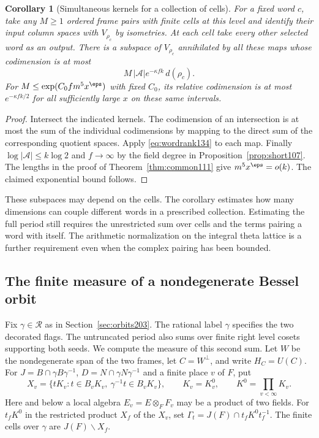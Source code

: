 \documentclass[a4paper,11pt]{article}
\newtheorem{corollary}[proposition]{Corollary}
\theoremstyle{definition}
\theoremstyle{remark}
\numberwithin{equation}{section}
\begin{document}
\begin{corollary}[Simultaneous kernels for a collection of cells]
\label{cor:many134}
For a fixed word \(c\), take any \(M\ge1\) ordered frame pairs
with finite cells at this level and identify their input column
spaces with \(V_{\rho_c}\) by isometries. At each cell take every
other selected word as an output. There is a subspace of
\(V_{\rho_c}\) annihilated by all these maps whose codimension
is at most
\[
             M\,|\mathcal A|e^{-\kappa fk}\,d(\rho_c).
\]
For \(M\le\exp(C_0 f m^5 x^\eps)\) with fixed \(C_0\), its
relative codimension is at most \(e^{-\kappa fk/2}\) for all
sufficiently large \(x\) on these same intervals.
\end{corollary}
\begin{proof}
Intersect the indicated kernels. The codimension of an
intersection is at most the sum of the individual codimensions
by mapping to the direct sum of the corresponding quotient
spaces. Apply \eqref{eq:wordrank134} to each map. Finally
\(\log|\mathcal A|\le k\log 2\) and \(f\to\infty\) by the field
degree in Proposition~\ref{prop:short107}. The lengths in the
proof of Theorem~\ref{thm:common111} give \(m^5x^\eps=o(k)\).
The claimed exponential bound follows.
\end{proof}

These subspaces may depend on the cells. The corollary estimates
how many dimensions can couple different words in a prescribed
collection. Estimating the full period still requires the
unrestricted sum over cells and the terms pairing a word with
itself. The arithmetic normalization on the integral theta
lattice is a further requirement even when the complex pairing
has been bounded.

\subsection{The finite measure of a nondegenerate Bessel orbit}\label{nav:IX-02}
\label{sec:cellmass205}

Fix \(\gamma\in\mathcal R\) as in Section~\ref{sec:orbits203}.
The rational label \(\gamma\) specifies the two decorated flags.
The untruncated period also sums over finite right level cosets
supporting both seeds. We compute the measure of this second sum.
Let \(W\) be the nondegenerate span of the two frames, let
\(C=W^\perp\), and write \(H_C=U(C)\). For
\(J=B\cap\gamma B\gamma^{-1}\), \(D=N\cap\gamma N\gamma^{-1}\)
and a finite place \(v\) of \(F\), put
\[
 X_v=\{tK_v:t\in B_vK_v,\ \gamma^{-1}t\in B_vK_v\},\qquad
          K_v=K_v^0,\qquad K^0=\prod_{v<\infty}K_v .
\]
Here and below a local algebra \(E_v=E\otimes_F F_v\) may be a
product of two fields. For \(t_fK^0\) in the restricted product
\(X_f\) of the \(X_v\), set \(\Gamma_t=J(F)\cap t_fK^0t_f^{-1}\).
The finite cells over \(\gamma\) are \(J(F)\backslash X_f\).
\end{document}

